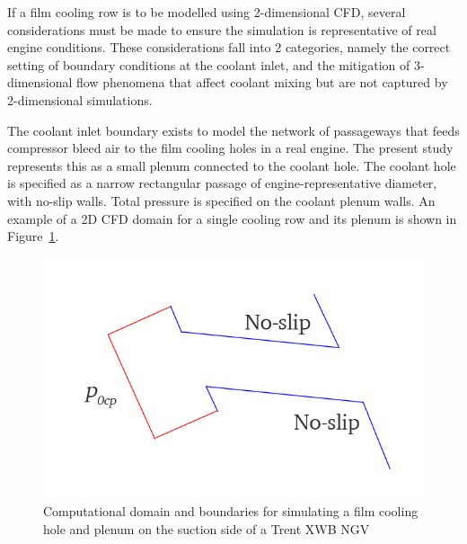\documentclass[a4paper, 11pt, oneside]{report}
\begin{document}
If a film cooling row is to be modelled using 2-dimensional CFD, several considerations must be made to ensure the simulation is representative of real engine conditions. These considerations fall into 2 categories, namely the correct setting of boundary conditions at the coolant inlet, and the mitigation of 3-dimensional flow phenomena that affect coolant mixing but are not captured by 2-dimensional simulations.

The coolant inlet boundary exists to model the network of passageways that feeds compressor bleed air to the film cooling holes in a real engine. The present study represents this as a small plenum connected to the coolant hole. The coolant hole is specified as a narrow rectangular passage of engine-representative diameter, with no-slip walls. Total pressure is specified on the coolant plenum walls. An example of a 2D CFD domain for a single cooling row and its plenum is shown in Figure~\ref{fig:film_cooling_hole_boundary_conditions}.

\begin{figure}[H]
	\centering
	\includegraphics[width=.45\textwidth]{figs/film_cooling_hole_boundary_conditions.png}
	\caption{Computational domain and boundaries for simulating a film cooling hole and plenum on the suction side of a Trent XWB NGV}
    \label{fig:film_cooling_hole_boundary_conditions}
\end{figure}
\end{document}
